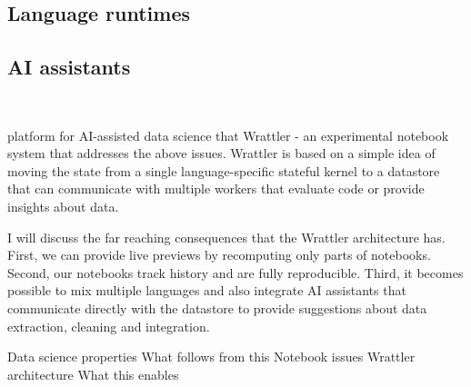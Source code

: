 \documentclass[sigplan,preprint,10pt]{acmart}\settopmatter{printfolios=true,printccs=false,printacmref=false}
\theoremstyle{plain}
\theoremstyle{definition}
\begin{document}
\subsection{Language runtimes}

\subsection{AI assistants}

\newpage
~
\newpage

platform for AI-assisted data science that  
Wrattler - an experimental notebook system that addresses the above issues. Wrattler is
 based on a simple idea of moving the state from a single language-specific stateful kernel
  to a datastore that can communicate with multiple workers that evaluate code or provide insights about data.
  
  I will discuss the far reaching consequences that the Wrattler architecture has. First, we can 
  provide live previews by recomputing only parts of notebooks. Second, our notebooks track 
  history and are fully reproducible. Third, it becomes possible to mix multiple languages and 
  also integrate AI assistants that communicate directly with the datastore to provide 
  suggestions about data extraction, cleaning and integration.



Data science properties
What follows from this
Notebook issues
Wrattler architecture
What this enables
\end{document}
